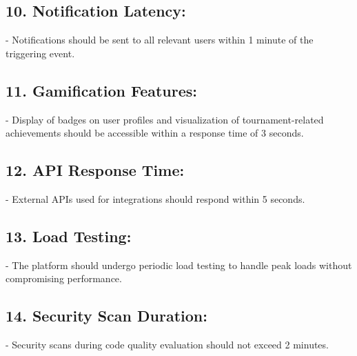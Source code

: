 \subsection*{10. Notification Latency:}
    - Notifications should be sent to all relevant users within 1 minute of the triggering event.

\subsection*{11. Gamification Features:}
    - Display of badges on user profiles and visualization of tournament-related achievements should be accessible within a response time of 3 seconds.

\subsection*{12. API Response Time:}
    - External APIs used for integrations should respond within 5 seconds.

\subsection*{13. Load Testing:}
    - The platform should undergo periodic load testing to handle peak loads without compromising performance.

\subsection*{14. Security Scan Duration:}
    - Security scans during code quality evaluation should not exceed 2 minutes.







